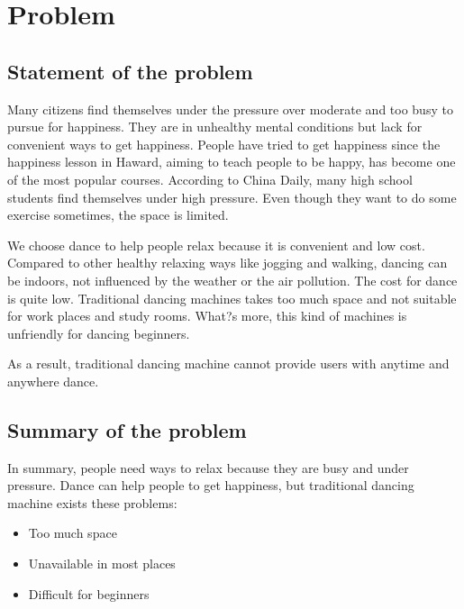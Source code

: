 \section{Problem}
\subsection{Statement of the problem}

Many citizens find themselves under the pressure over moderate and too busy to
pursue for happiness. They are in unhealthy mental conditions but lack for
convenient ways to get happiness. People have tried to get happiness since the
happiness lesson in Haward, aiming to teach people to be happy, has become one
of the most popular courses. According to China Daily, many high school students
find themselves under high pressure. Even though they want to do some exercise
sometimes, the space is limited.

We choose dance to help people relax because it is convenient and low cost.
Compared to other healthy relaxing ways like jogging and walking, dancing can be
indoors, not influenced by the weather or the air pollution. The cost for dance
is quite low. Traditional dancing machines takes too much space and not suitable
for work places and study rooms. What?s more, this kind of machines is
unfriendly for dancing beginners.

As a result, traditional dancing machine cannot provide users with anytime and
anywhere dance. 

\subsection{Summary of the problem}

In summary, people need ways to relax because they are busy and under pressure.
Dance can help people to get happiness, but traditional dancing machine exists
these problems: 

\begin{itemize}
\item Too much space
\item Unavailable in most places
\item Difficult for beginners
\end{itemize}
